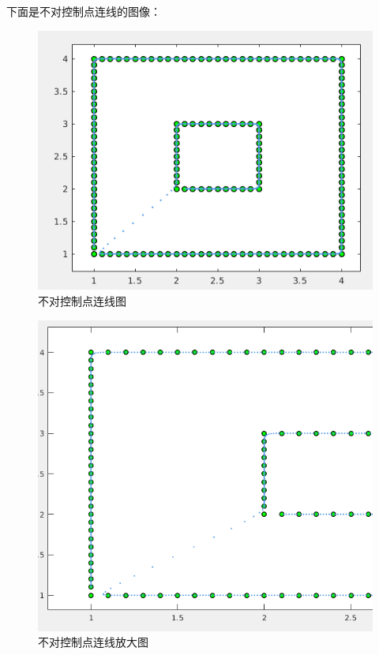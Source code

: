 \documentclass[12pt,a4paper]{article}
\begin{document}
下面是不对控制点连线的图像：
\begin{figure}[ht]
	\centering
	\includegraphics[scale=0.4]{./figures/noline.png}
	\caption{不对控制点连线图}
	\label{fig:label}	
\end{figure}
\begin{figure}[ht]
	\centering
	\includegraphics[scale=0.4]{./figures/nolineb.png}
	\caption{不对控制点连线放大图}
	\label{fig:label}	
\end{figure}
\end{document}
